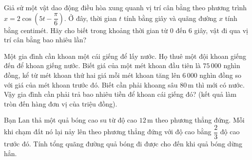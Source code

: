 \caukq
\begin{ex}%
Giả sử một vật dao động điều hòa xung quanh vị trí cân bằng theo phương trình $x=2\cos\left(5t-\dfrac{\pi}{6} \right)$. Ở đây, thời gian $t$ tính bằng giây và quãng đường $x$ tính bằng centimét. Hãy cho biết trong khoảng thời gian từ $0$ đến $6$ giây, vật đi qua vị trí cân bằng bao nhiêu lần?
\end{ex}

\begin{ex}%
Một gia đình cần khoan một cái giếng để lấy nước. Họ thuê một đội khoan giếng đến để khoan giếng nước. Biết giá của một mét khoan đầu tiên là $75\,000$ nghìn đồng, kể từ mét khoan thứ hai giá mỗi mét khoan tăng lên $6\,000$ nghìn đồng so với giá của mét khoan trước đó. Biết cần phải khoang sâu $80\mathrm{\,m}$ thì mới có nước. Vậy gia đình cần phải trả bao nhiêu tiền để khoan cái giếng đó? (kết quả làm tròn đến hàng đơn vị của triệu đồng).
\end{ex}

\begin{ex}%
Bạn Lan thả một quả bóng cao su từ độ cao $12\mathrm{\,m}$ theo phương thẳng đứng. Mỗi khi chạm đất nó lại nảy lên theo phương thẳng đứng với độ cao bằng $\dfrac{2}{3}$ độ cao trước đó. Tính tổng quãng đường quả bóng đi được cho đến khi quả bóng dừng hẳn.
\end{ex}

